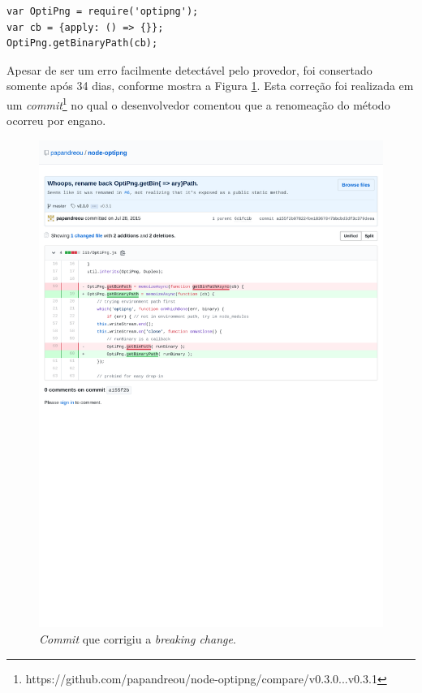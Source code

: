 \begin{lstlisting}[style=Javascript, label=cod:bc:optipng, caption={Código que sofre \textit{breaking change} do pacote \textit{optipng}.}]
var OptiPng = require('optipng');
var cb = {apply: () => {}};
OptiPng.getBinaryPath(cb);
\end{lstlisting}

Apesar de ser um erro facilmente detectável pelo provedor, foi consertado somente após 34 dias, conforme mostra a Figura \ref{fig:bc_optipng}. Esta correção foi realizada em um \textit{commit}\footnote{https://github.com/papandreou/node-optipng/compare/v0.3.0...v0.3.1} no qual o desenvolvedor comentou que a renomeação do método ocorreu por engano.

\begin{figure}
    \centering
    \includegraphics[scale=0.75]{figuras/bc_example.pdf}
    \caption{\textit{Commit} que corrigiu a \textit{breaking change}.}
    \label{fig:bc_optipng}
\end{figure}{}

